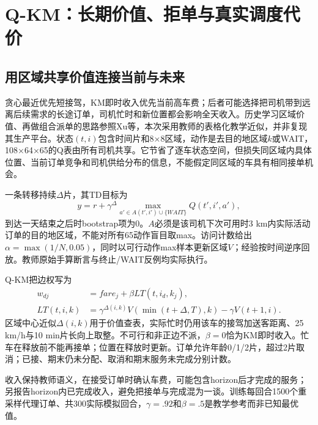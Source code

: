 \section{Q-KM：长期价值、拒单与真实调度代价}
\subsection{用区域共享价值连接当前与未来}
贪心最近优先短接驾，KM即时收入优先当前高车费；后者可能选择把司机带到远离后续需求的长途订单，司机忙时和新位置都会影响全天收入。历史学习区域价值、再做组合派单的思路参照Xu等\cite{xu}，本次采用教师的表格化教学近似，并非复现其生产平台。状态$(t,i)$包含时间片和8×8区域，动作是去目的地区域$k$或WAIT，108×64×65的Q表由所有司机共享。它节省了逐车状态空间，但损失同区域内具体位置、当前订单竞争和司机供给分布的信息，不能假定同区域的车具有相同接单机会。

一条转移持续$\Delta$片，其TD目标为
\begin{equation}
y=r+\gamma^{\Delta}\max_{a'\in A(t',i')\cup\{WAIT\}}Q(t',i',a'),
\end{equation}
到达一天结束之后时bootstrap项为0。$A$必须是该司机下次可用时3 km内实际活动订单的目的地区域，不能对所有65动作盲目取max。访问计数给出$\alpha=\max(1/N,0.05)$，同时以可行动作max样本更新区域$V$；经验按时间逆序回放。教师原始手算断言与终止/WAIT反例均实际执行。

Q-KM把边权写为
\begin{align}
w_{dj}&=fare_j+\beta LT(t,i_d,k_j),\\
LT(t,i,k)&=\gamma^{\Delta(i,k)}V(\min(t+\Delta,T),k)-\gamma V(t+1,i).
\end{align}
区域中心近似$\Delta(i,k)$用于价值查表，实际忙时仍用该车的接驾加送客距离、25 km/h与10 min片长向上取整。不可行和非正边不派，$\beta=0$恰为KM即时收入。忙车在释放前不能再接单；位置在释放时更新。订单允许年龄0/1/2片，超过2片取消；已接、期末仍未分配、取消和期末服务未完成分别计数。

收入保持教师语义，在接受订单时确认车费，可能包含horizon后才完成的服务；另报告horizon内已完成收入，避免把接单与完成混为一谈。训练每回合1500个重采样代理订单、共300实际模拟回合，$\gamma=.92$和$\beta=.5$是教学参考而非已知最优值。


